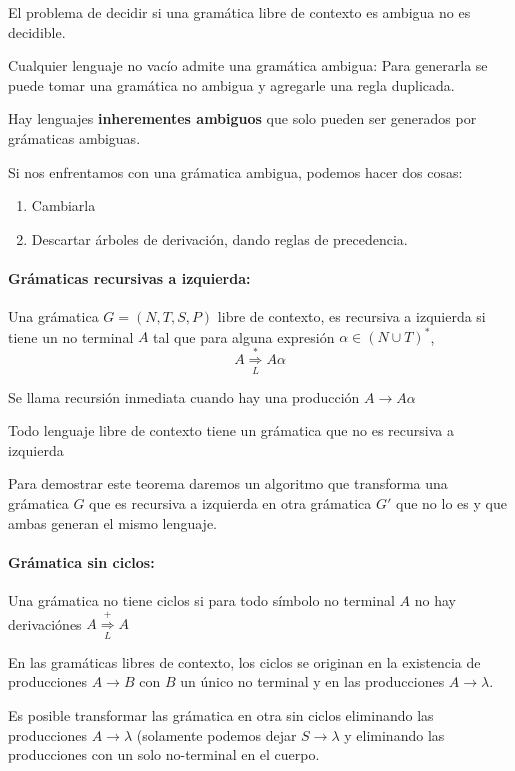 El problema de decidir si una gramática libre de contexto es ambigua no es decidible.

Cualquier lenguaje no vacío admite una gramática ambigua: Para generarla se puede tomar una gramática no ambigua y agregarle una regla duplicada.

Hay lenguajes \textbf{inherementes ambiguos} que solo pueden ser generados por grámaticas ambiguas.

Si nos enfrentamos con una grámatica ambigua, podemos hacer dos cosas:
\begin{enumerate}
  \item Cambiarla
  \item Descartar árboles de derivación, dando reglas de precedencia.
\end{enumerate}

\paragraph{Grámaticas recursivas a izquierda:} Una grámatica \(G = (N, T, S, P)\) libre de contexto, es recursiva a izquierda si tiene un no terminal \(A\) tal que para alguna expresión \(\alpha\in(N\cup T)^*\), \[ A\underset{L}{\overset{*}{\Rightarrow}}A\alpha\]

Se llama recursión inmediata cuando hay una producción \(A\to A\alpha\)

\begin{teorema}
  Todo lenguaje libre de contexto tiene un grámatica que no es recursiva a izquierda
\end{teorema}

Para demostrar este teorema daremos un algoritmo que transforma una grámatica \(G\) que es recursiva a izquierda en otra grámatica \(G'\) que no lo es y que ambas generan el mismo lenguaje.

\paragraph{Grámatica sin ciclos:} Una grámatica no tiene ciclos si para todo símbolo no terminal \(A\) no hay derivaciónes \(A\overset{+}{\underset{L}{\Rightarrow}} A\)

En las gramáticas libres de contexto, los ciclos se originan en la existencia de producciones \(A\to B\) con \(B\) un único no terminal y en las producciones \(A\to\lambda\).

Es posible transformar las grámatica en otra sin ciclos eliminando las producciones \(A\to\lambda\) (solamente podemos dejar \(S\to\lambda\) y eliminando las producciones con un solo no-terminal en el cuerpo.

